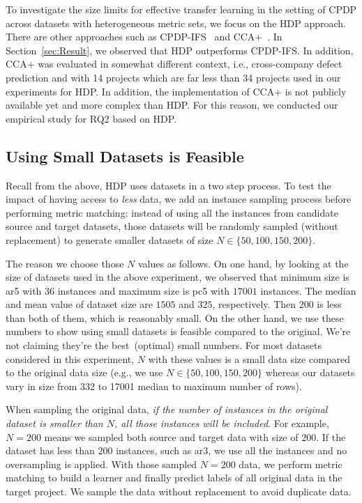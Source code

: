 To investigate the size limits for effective transfer learning in the setting of CPDP across datasets with heterogeneous metric sets, we focus on the HDP approach. There are other approaches such as CPDP-IFS~\cite{He14} and CCA+~\cite{Jing15}. In Section~\ref{sec:Result}, we observed that HDP outperforms CPDP-IFS. In addition, CCA+ was evaluated in somewhat different context, i.e., cross-company defect prediction and with 14 projects which are far less than 34 projects used in our experiments for HDP. In addition, the implementation of CCA+ is not publicly available yet and more complex than HDP. For this reason, we conducted our empirical study for RQ2 based on HDP.




\subsection{Using Small Datasets is Feasible}

Recall from the above,
HDP uses  datasets  in a two step process.
To test the impact of having access to {\em less} data,
we  add an instance sampling process before performing metric matching:
instead of using all the instances from
candidate source and target datasets, those datasets will
be randomly sampled (without replacement) to generate smaller datasets of
size $N \in \{50, 100, 150, 200\}$.

The reason we choose those $N$ values as follows. On one hand, by looking at the size of datasets used in the
above experiment, we observed that minimum size is ar5 with $36$ instances and maximum size is pc5 with $17001$ instances.
The median and mean value of dataset size are $1505$ and $325$, respectively. Then $200$ is less than both of
them, which is reasonably small.
On the other hand, we use these numbers to show using small datasets is feasible compared to
the original. We're not claiming they're the best~(optimal) small numbers. For most datasets considered in this experiment, $N$ with these values is a
small data size compared to the original data size (e.g., we use $N \in \{50, 100, 150, 200\}$ whereas our datasets vary in size from 332 to 17001  median
to maximum number of rows).

When sampling the original data, {\it if
the number of instances in the original dataset is
smaller than $N$, all those instances will be
included}. For example, $N=200$ means we sampled both source and target data with size of $200$. If the dataset has less than $200$ instances, such as ar3, we use all
the instances and no oversampling is applied. With those sampled $N=200$ data, we perform metric matching to build a learner
and finally predict labels of all original data in the target project. We sample the data without replacement
to avoid duplicate data.


